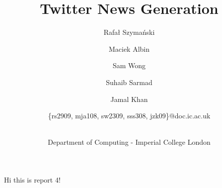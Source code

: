 \documentclass{report}
\title{Twitter News Generation}
\author{
    \small{Rafał Szymański}\\
  	\and
    \small{Maciek Albin}\\
    \and
    \small{Sam Wong}\\
    \and  
    \small{Suhaib Sarmad}\\
		\and
		\small{Jamal Khan}\\
		\and
		\small{\{rs2909, mja108, sw2309, sss308, jzk09\}@doc.ic.ac.uk}
		\and
		\\Department of Computing - Imperial College London
}
\begin{document}
 
	\maketitle
	
  Hi this is report 4!
  
\end{document}

